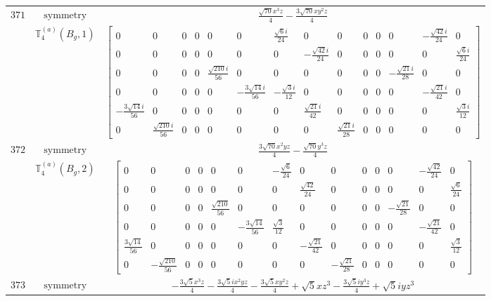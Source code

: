 \documentclass[fleqn,8pt,landscape]{jsarticle}
\begin{document}
\begin{longtable}{ccc}
$ 371 $ & $ \text{symmetry} $ & $ \frac{\sqrt{70} x^{3} z}{4} - \frac{3 \sqrt{70} x y^{2} z}{4} $ \\
$  $ & $ \mathbb{T}_{4}^{(a)}(B_{g},1) $ & $ \begin{bmatrix} 0 & 0 & 0 & 0 & 0 & 0 & \frac{\sqrt{6} i}{24} & 0 & 0 & 0 & 0 & 0 & - \frac{\sqrt{42} i}{24} & 0 \\ 0 & 0 & 0 & 0 & 0 & 0 & 0 & - \frac{\sqrt{42} i}{24} & 0 & 0 & 0 & 0 & 0 & \frac{\sqrt{6} i}{24} \\ 0 & 0 & 0 & 0 & \frac{\sqrt{210} i}{56} & 0 & 0 & 0 & 0 & 0 & 0 & - \frac{\sqrt{21} i}{28} & 0 & 0 \\ 0 & 0 & 0 & 0 & 0 & - \frac{3 \sqrt{14} i}{56} & - \frac{\sqrt{3} i}{12} & 0 & 0 & 0 & 0 & 0 & - \frac{\sqrt{21} i}{42} & 0 \\ - \frac{3 \sqrt{14} i}{56} & 0 & 0 & 0 & 0 & 0 & 0 & \frac{\sqrt{21} i}{42} & 0 & 0 & 0 & 0 & 0 & \frac{\sqrt{3} i}{12} \\ 0 & \frac{\sqrt{210} i}{56} & 0 & 0 & 0 & 0 & 0 & 0 & \frac{\sqrt{21} i}{28} & 0 & 0 & 0 & 0 & 0 \end{bmatrix} $ \\ \hline
$ 372 $ & $ \text{symmetry} $ & $ \frac{3 \sqrt{70} x^{2} y z}{4} - \frac{\sqrt{70} y^{3} z}{4} $ \\
$  $ & $ \mathbb{T}_{4}^{(a)}(B_{g},2) $ & $ \begin{bmatrix} 0 & 0 & 0 & 0 & 0 & 0 & - \frac{\sqrt{6}}{24} & 0 & 0 & 0 & 0 & 0 & - \frac{\sqrt{42}}{24} & 0 \\ 0 & 0 & 0 & 0 & 0 & 0 & 0 & \frac{\sqrt{42}}{24} & 0 & 0 & 0 & 0 & 0 & \frac{\sqrt{6}}{24} \\ 0 & 0 & 0 & 0 & \frac{\sqrt{210}}{56} & 0 & 0 & 0 & 0 & 0 & 0 & - \frac{\sqrt{21}}{28} & 0 & 0 \\ 0 & 0 & 0 & 0 & 0 & - \frac{3 \sqrt{14}}{56} & \frac{\sqrt{3}}{12} & 0 & 0 & 0 & 0 & 0 & - \frac{\sqrt{21}}{42} & 0 \\ \frac{3 \sqrt{14}}{56} & 0 & 0 & 0 & 0 & 0 & 0 & - \frac{\sqrt{21}}{42} & 0 & 0 & 0 & 0 & 0 & \frac{\sqrt{3}}{12} \\ 0 & - \frac{\sqrt{210}}{56} & 0 & 0 & 0 & 0 & 0 & 0 & - \frac{\sqrt{21}}{28} & 0 & 0 & 0 & 0 & 0 \end{bmatrix} $ \\ \hline
$ 373 $ & $ \text{symmetry} $ & $ - \frac{3 \sqrt{5} x^{3} z}{4} - \frac{3 \sqrt{5} i x^{2} y z}{4} - \frac{3 \sqrt{5} x y^{2} z}{4} + \sqrt{5} x z^{3} - \frac{3 \sqrt{5} i y^{3} z}{4} + \sqrt{5} i y z^{3} $ \\

\end{longtable}
\end{document}

